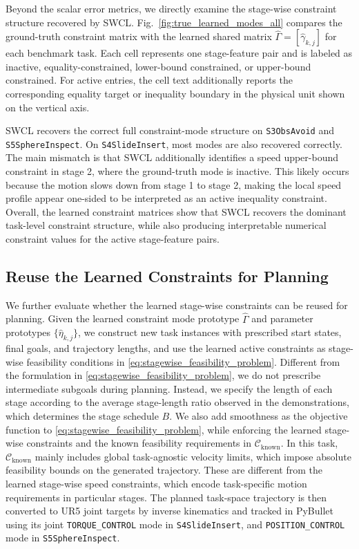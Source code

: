 \documentclass[lettersize,journal]{IEEEtran}
\begin{document}
Beyond the scalar error metrics, we directly examine the stage-wise constraint structure recovered by SWCL. Fig.~\ref{fig:true_learned_modes_all} compares the ground-truth constraint matrix with the learned shared matrix $\hat{\Gamma}=[\hat{\gamma}_{k,j}]$ for each benchmark task. Each cell represents one stage-feature pair and is labeled as inactive, equality-constrained, lower-bound constrained, or upper-bound constrained. For active entries, the cell text additionally reports the corresponding equality target or inequality boundary in the physical unit shown on the vertical axis. 

SWCL recovers the correct full constraint-mode structure on \texttt{S3ObsAvoid} and \texttt{S5SphereInspect}. On \texttt{S4SlideInsert}, most modes are also recovered correctly. The main mismatch is that SWCL additionally identifies a speed upper-bound constraint in stage 2, where the ground-truth mode is inactive. This likely occurs because the motion slows down from stage 1 to stage 2, making the local speed profile appear one-sided to be interpreted as an active inequality constraint. Overall, the learned constraint matrices show that SWCL recovers the dominant task-level constraint structure, while also producing interpretable numerical constraint values for the active stage-feature pairs.

\subsection{Reuse the Learned Constraints for Planning}
\label{sec:planning_learned_constraints}
We further evaluate whether the learned stage-wise constraints can be reused for planning. Given the learned constraint mode prototype $\hat\Gamma$ and parameter prototypes $\{\hat\eta_{k,j}\}$, we construct new task instances with prescribed start states, final goals, and trajectory lengths, and use the learned active constraints as stage-wise feasibility conditions in \eqref{eq:stagewise_feasibility_problem}. Different from the formulation in \eqref{eq:stagewise_feasibility_problem}, we do not prescribe intermediate subgoals during planning. Instead, we specify the length of each stage according to the average stage-length ratio observed in the demonstrations, which determines the stage schedule $B$. We also add smoothness as the objective function to \eqref{eq:stagewise_feasibility_problem}, while enforcing the learned stage-wise constraints and the known feasibility requirements in $\mathcal{C}_{\mathrm{known}}$. In this task, $\mathcal{C}_{\mathrm{known}}$ mainly includes global task-agnostic velocity limits, which impose absolute feasibility bounds on the generated trajectory. These are different from the learned stage-wise speed constraints, which encode task-specific motion requirements in particular stages. The planned task-space trajectory is then converted to UR5 joint targets by inverse kinematics and tracked in PyBullet using its joint \texttt{TORQUE\_CONTROL} mode in \texttt{S4SlideInsert}, and  \texttt{POSITION\_CONTROL} mode in \texttt{S5SphereInspect}.
\end{document}
